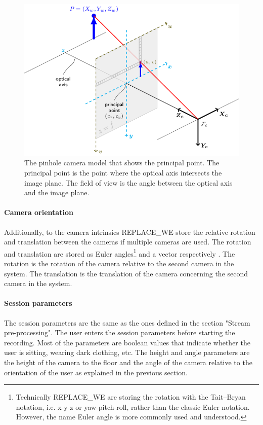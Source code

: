 \begin{figure}[ht]
  \centering
  \includegraphics[width=.9\textwidth]{figures/CameraCalibration/pinhole_camera_model.png}
  \caption[Pinhole camera model]{The pinhole camera model that shows the principal point. The principal point is the point where the optical axis intersects the image plane. The field of view is the angle between the optical axis and the image plane.}
  \label{fig:pinhole_camera_model}
\end{figure}

\paragraph{Camera orientation}

Additionally, to the camera intrinsics REPLACE_WE store the relative rotation and translation between the cameras if multiple cameras are used. The rotation and translation are stored as Euler angles\footnote{Technically REPLACE_WE are storing the rotation with the Tait–Bryan notation, i.e. x-y-z or yaw-pitch-roll, rather than the classic Euler notation. However, the name Euler angle is more commonly used and understood.} and a vector respectively \cite{euler1776formulae}. The rotation is the rotation of the camera relative to the second camera in the system. The translation is the translation of the camera concerning the second camera in the system.

\paragraph{Session parameters}

The session parameters are the same as the ones defined in the section "Stream pre-processing". The user enters the session parameters before starting the recording. Most of the parameters are boolean values that indicate whether the user is sitting, wearing dark clothing, etc. The height and angle parameters are the height of the camera to the floor and the angle of the camera relative to the orientation of the user as explained in the previous section.

